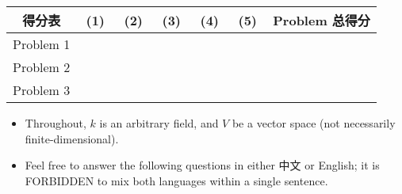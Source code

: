 \documentclass{MainStyle}
\theoremstyle{definition}
\begin{document}
\large
\maketitle



\begin{center}
    \begin{tabular}{|| c | c | c | c | c | c | c ||}
        \hline
        得分表    & (1)      & (2)      & (3)      & (4)      & (5)      & Problem 总得分 \\ [0.5ex]
        \hline\hline
        Problem 1 & $\qquad$ & $\qquad$ & $\qquad$ & $\qquad$ & $\qquad$ &                \\[1em]
        \hline
        Problem 2 &          &          &          &          &          &                \\[1em]
        \hline
        Problem 3 &          &          &          &          &          &                \\[1em]
        \hline
    \end{tabular}
\end{center}

\vspace{4cm}

\begin{itemize}
    \item Throughout, $k$ is an arbitrary field, and $V$ be a vector space (not necessarily finite-dimensional).
    \item Feel free to answer the following questions in either 中文 or English; it is FORBIDDEN to mix both languages within a single sentence.
\end{itemize}

\newpage
\end{document}
